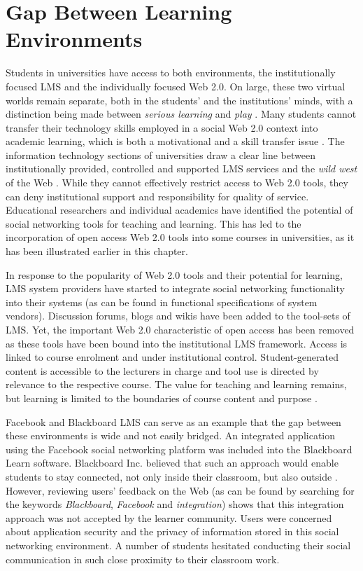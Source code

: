 \section{Gap Between Learning Environments}
Students in universities have access to both environments, the institutionally
focused LMS and the individually focused Web 2.0. On large, these two virtual
worlds remain separate, both in the students' and the institutions' minds, with
a distinction being made between \textit{serious learning} and \textit{play}
\citep{Freire2008}. Many students cannot transfer their technology skills
employed in a social Web 2.0 context into academic learning, which is both a
motivational and a skill transfer issue \citep{Katz2005}. The information
technology sections of universities draw a clear line between institutionally
provided, controlled and supported LMS services and the \textit{wild west} of
the Web \citep{Havenstein2007a}. While they cannot effectively restrict access
to Web 2.0 tools, they can deny institutional support and responsibility for
quality of service. Educational researchers and individual academics have
identified the potential of social networking tools for teaching and learning.
This has led to the incorporation of open access Web 2.0 tools into some courses
in universities, as it has been illustrated earlier in this chapter.

In response to the popularity of Web 2.0 tools and their potential for learning,
LMS system providers have started to integrate social networking functionality
into their systems (as can be found in functional specifications of system
vendors). Discussion forums, blogs and wikis have been added to the tool-sets of
LMS. Yet, the important Web 2.0 characteristic of open access has been removed
as these tools have been bound into the institutional LMS framework. Access is
linked to course enrolment and under institutional control. Student-generated
content is accessible to the lecturers in charge and tool use is directed by
relevance to the respective course. The value for teaching and learning remains,
but learning is limited to the boundaries of course content and purpose
\citep{Mott2010}.

Facebook and Blackboard LMS can serve as an example that the gap between
these environments is wide and not easily bridged. An integrated application
using the Facebook social networking platform was included into the Blackboard
Learn software. Blackboard Inc. believed that such an approach would enable
students to stay connected, not only inside their classroom, but also outside
\citep{BlackboardInc.2009}. However, reviewing users' feedback on the Web (as
can be found by searching for the keywords \textit{Blackboard},
\textit{Facebook} and \textit{integration}) shows that this integration approach
was not accepted by the learner community. Users were concerned about
application security and the privacy of information stored in this social
networking environment. A number of students hesitated conducting their social
communication in such close proximity to their classroom work. 


